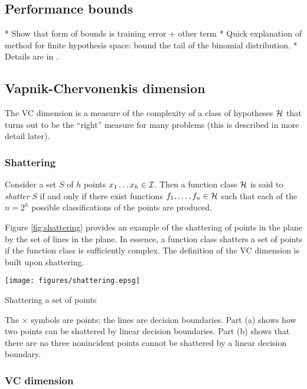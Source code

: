 \subsection{Performance bounds}

* Show that form of bounds is training error + other term
* Quick explanation of method for finite hypothesis space: bound the
  tail of the binomial distribution.
* Details are in \cite{Bartlett98b}.


\subsection{Vapnik-Chervonenkis dimension}

The VC dimension is a measure of the complexity of a class of
hypotheses $\mathcal{H}$ that turns out to be the ``right'' measure for many
problems (this is described in more detail later).

\subsubsection{Shattering}

\begin{definition}[Shattering]
Consider a set $S$ of $h$ points $x_1 \ldots x_h \in \mathcal{I}$.  Then a
function class $\mathcal{H}$ is said to \emph{shatter} $S$ if and only if
there exist functions $f_1, \ldots, f_n \in \mathcal{H}$ such that each of
the $n = 2^h$ possible classifications of the points are produced.
\end{definition}

Figure \ref{fig:shattering} provides an example of the shattering of
points in the plane by the set of lines in the plane.  In essence, a
function class shatters a set of points if the function class is
sufficiently complex.  The definition of the VC dimension is built
upon shattering.

\begin{linefigure}
\begin{center}
\texttt{[image: figures/shattering.epsg]}
\end{center}
\caption{Shattering a set of points}
\label{fig:shattering}
The $\times$ symbols are points; the lines are decision boundaries.
Part (a) shows how two points can be shattered by linear decision
boundaries.  Part (b) shows that there are no three nonincident points
cannot be shattered by a linear decision boundary.
\end{linefigure}


\subsubsection{VC dimension}

